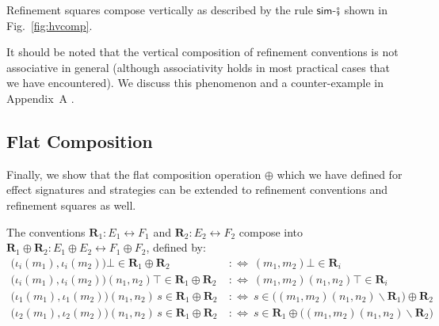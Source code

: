 \documentclass[acmsmall,nonacm]{acmart}
\newcommand{\kw}[1]{\ensuremath{ \mathsf{#1} }}
\begin{document}
\begin{theorem} \label{thm:vcomp}
Refinement squares compose vertically
as described by the rule $\kw{sim}$-$\fatsemi$
shown in Fig.~\ref{fig:hvcomp}.
\end{theorem}

\begin{remark} \label{rem:vcomp-assoc}
It should be noted that the vertical composition
of refinement conventions
is not associative in general
(although associativity holds
in most practical cases that we have encountered).
We discuss this phenomenon and a counter-example
in Appendix~A \citep{compcertoe-tr}.
\end{remark}


\subsection{Flat Composition} %

Finally,
we show that the flat composition operation $\oplus$
which we have defined for effect signatures and strategies
can be extended to refinement conventions and refinement squares as well.

\begin{definition}
The conventions
$\mathbf{R}_1 : E_1 \leftrightarrow F_1$ and
$\mathbf{R}_2 : E_2 \leftrightarrow F_2$
compose into
$\mathbf{R}_1 \oplus \mathbf{R}_2 : E_1 \oplus E_2 \leftrightarrow F_1 \oplus F_2$,
defined by:
\begin{align*}
  \bigl(\iota_i(m_1), \iota_i(m_2)\bigr)\bot \in \mathbf{R}_1 \oplus \mathbf{R}_2
  \:&:\Leftrightarrow\:
  (m_1,m_2)\bot \in \mathbf{R}_i
\\
  \bigl(\iota_i(m_1), \iota_i(m_2)\bigr)(n_1,n_2)\top \in \mathbf{R}_1 \oplus \mathbf{R}_2
  \:&:\Leftrightarrow\:
  (m_1,m_2)(n_1,n_2)\top \in \mathbf{R}_i
\\
  \bigl(\iota_1(m_1), \iota_1(m_2) \bigr)(n_1,n_2) \, s \in \mathbf{R}_1 \oplus \mathbf{R}_2
  \:&:\Leftrightarrow\:
  s \in \bigl( (m_1,m_2)(n_1,n_2) \backslash \mathbf{R}_1 \bigr) \oplus \mathbf{R}_2
\\
  \bigl(\iota_2(m_1), \iota_2(m_2) \bigr)(n_1,n_2) \, s \in \mathbf{R}_1 \oplus \mathbf{R}_2
  \:&:\Leftrightarrow\:
  s \in \mathbf{R}_1 \oplus \bigl( (m_1,m_2)(n_1,n_2) \backslash \mathbf{R}_2 \bigr)
\end{align*}
\end{definition}
\end{document}
